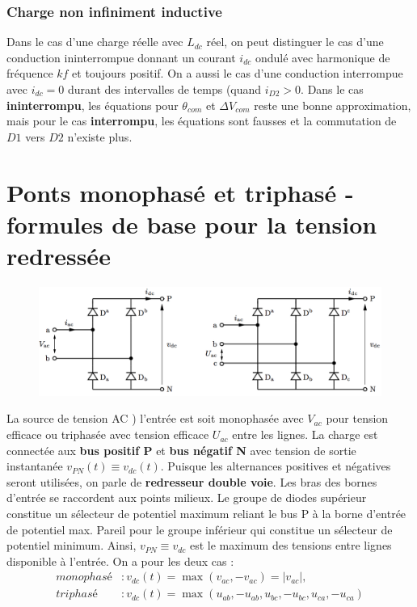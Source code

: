 		\subsubsection{Charge non infiniment inductive}
			Dans le cas d'une charge réelle avec $L_{dc}$ réel, on peut distinguer le cas d'une conduction ininterrompue donnant un courant $i_{dc}$ ondulé avec harmonique de fréquence $kf$ et toujours positif. On a aussi le cas d'une conduction interrompue avec $i_{dc} = 0$ durant des intervalles de temps (quand $i_{D2} >0$. Dans le cas \textbf{ininterrompu}, les équations pour $\theta _{com}$ et $\Delta V_{com}$ reste une bonne approximation, mais pour le cas \textbf{interrompu}, les équations sont fausses et la commutation de $D1$ vers $D2$ n'existe plus. 
			
\section{Ponts monophasé et triphasé - formules de base pour la tension redressée}
	\begin{figure}
	\vspace{-5mm}
	\includegraphics[scale=0.3]{ch2/8}
	\end{figure} 			
	La source de tension AC ) l'entrée est soit monophasée avec $V_{ac}$ pour tension efficace ou triphasée avec tension efficace $U_{ac}$ entre les lignes. La charge est connectée aux \textbf{bus positif P}  et \textbf{bus négatif N} avec tension de sortie instantanée $v_{PN}(t) \equiv v_{dc}(t)$. Puisque les alternances positives et négatives seront utilisées, on parle de \textbf{redresseur double voie}. Les bras des bornes d'entrée se raccordent aux points milieux. Le groupe de diodes supérieur constitue un sélecteur de potentiel maximum reliant le bus P à la borne d'entrée de potentiel max. Pareil pour le groupe inférieur qui constitue un sélecteur de potentiel minimum. Ainsi, $v_{PN} \equiv v_{dc}$ est le maximum des tensions entre lignes disponible à l'entrée. On a pour les deux cas : 
	\begin{equation}
	\begin{aligned}
		monophasé &: v_{dc}(t) = \max (v_{ac}, -v_{ac}) = |v_{ac}|,\\
		triphasé &: v_{dc}(t) = \max (u_{ab}, -u_{ab}, u_{bc}, -u_{bc}, u_{ca}, -u_{ca})
	\end{aligned}
	\end{equation}
	
